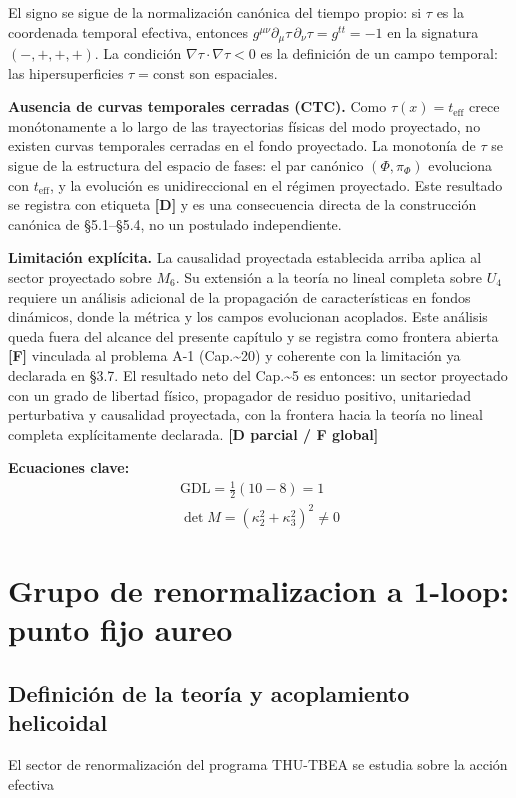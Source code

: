 ﻿\documentclass[11pt,letterpaper]{article}
\begin{document}
El signo se sigue de la normalización canónica del tiempo propio: si $\tau$ es la coordenada temporal efectiva, entonces $g^{\mu\nu}\partial_\mu\tau\,\partial_\nu\tau = g^{tt} = -1$ en la signatura $(-,+,+,+)$. La condición $\nabla\tau \cdot \nabla\tau < 0$ es la definición de un campo temporal: las hipersuperficies $\tau = \text{const}$ son espaciales.

\textbf{Ausencia de curvas temporales cerradas (CTC).} Como $\tau(x) = t_{\text{eff}}$ crece monótonamente a lo largo de las trayectorias físicas del modo proyectado, no existen curvas temporales cerradas en el fondo proyectado. La monotonía de $\tau$ se sigue de la estructura del espacio de fases: el par canónico $(\Phi, \pi_\Phi)$ evoluciona con $t_{\text{eff}}$, y la evolución es unidireccional en el régimen proyectado. Este resultado se registra con etiqueta \textbf{[D]} y es una consecuencia directa de la construcción canónica de §5.1--§5.4, no un postulado independiente.

\textbf{Limitación explícita.} La causalidad proyectada establecida arriba aplica al sector proyectado sobre $M_6$. Su extensión a la teoría no lineal completa sobre $U_4$ requiere un análisis adicional de la propagación de características en fondos dinámicos, donde la métrica y los campos evolucionan acoplados. Este análisis queda fuera del alcance del presente capítulo y se registra como frontera abierta \textbf{[F]} vinculada al problema A-1 (Cap.\textasciitilde{}20) y coherente con la limitación ya declarada en §3.7. El resultado neto del Cap.\textasciitilde{}5 es entonces: un sector proyectado con un grado de libertad físico, propagador de residuo positivo, unitariedad perturbativa y causalidad proyectada, con la frontera hacia la teoría no lineal completa explícitamente declarada. \textbf{[D parcial / F global]}

\textbf{Ecuaciones clave:}
\begin{align*}
    \mathrm{GDL} = \frac{1}{2}(10-8) = 1 \\
    \det M = (\kappa_2^2+\kappa_3^2)^2 \neq 0
\end{align*}
\section{Grupo de renormalizacion a 1-loop: punto fijo aureo}
\subsection{Definición de la teoría y acoplamiento helicoidal}
El sector de renormalización del programa THU-TBEA se estudia sobre la acción efectiva
\end{document}
